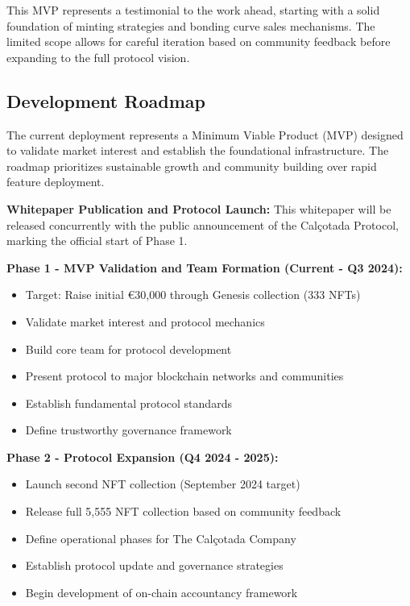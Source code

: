 \documentclass[conference]{IEEEtran}
\begin{document}
This MVP represents a testimonial to the work ahead, starting with a solid foundation of minting strategies and bonding curve sales mechanisms. The limited scope allows for careful iteration based on community feedback before expanding to the full protocol vision.

\subsection{Development Roadmap}

The current deployment represents a Minimum Viable Product (MVP) designed to validate market interest and establish the foundational infrastructure. The roadmap prioritizes sustainable growth and community building over rapid feature deployment.

\textbf{Whitepaper Publication and Protocol Launch:}
This whitepaper will be released concurrently with the public announcement of the Calçotada Protocol, marking the official start of Phase 1.

\textbf{Phase 1 - MVP Validation and Team Formation (Current - Q3 2024):}
\begin{itemize}
    \item Target: Raise initial €30,000 through Genesis collection (333 NFTs)
    \item Validate market interest and protocol mechanics
    \item Build core team for protocol development
    \item Present protocol to major blockchain networks and communities
    \item Establish fundamental protocol standards
    \item Define trustworthy governance framework
\end{itemize}

\textbf{Phase 2 - Protocol Expansion (Q4 2024 - 2025):}
\begin{itemize}
    \item Launch second NFT collection (September 2024 target)
    \item Release full 5,555 NFT collection based on community feedback
    \item Define operational phases for The Calçotada Company
    \item Establish protocol update and governance strategies
    \item Begin development of on-chain accountancy framework
\end{itemize}
\end{document}

